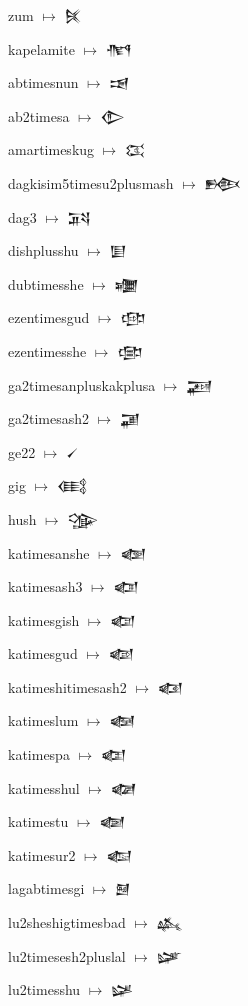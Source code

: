 {\noindent zum $\mapsto$ {\cufont 𒍮}\par
\noindent kapelamite $\mapsto$ {\cufont 𒍯}\par
\noindent abtimesnun $\mapsto$ {\cufont 𒍰}\par
\noindent ab2timesa $\mapsto$ {\cufont 𒍱}\par
\noindent amartimeskug $\mapsto$ {\cufont 𒍲}\par
\noindent dagkisim5timesu2plusmash $\mapsto$ {\cufont 𒍳}\par
\noindent dag3 $\mapsto$ {\cufont 𒍴}\par
\noindent dishplusshu $\mapsto$ {\cufont 𒍵}\par
\noindent dubtimesshe $\mapsto$ {\cufont 𒍶}\par
\noindent ezentimesgud $\mapsto$ {\cufont 𒍷}\par
\noindent ezentimesshe $\mapsto$ {\cufont 𒍸}\par
\noindent ga2timesanpluskakplusa $\mapsto$ {\cufont 𒍹}\par
\noindent ga2timesash2 $\mapsto$ {\cufont 𒍺}\par
\noindent ge22 $\mapsto$ {\cufont 𒍻}\par
\noindent gig $\mapsto$ {\cufont 𒍼}\par
\noindent hush $\mapsto$ {\cufont 𒍽}\par
\noindent katimesanshe $\mapsto$ {\cufont 𒍾}\par
\noindent katimesash3 $\mapsto$ {\cufont 𒍿}\par
\noindent katimesgish $\mapsto$ {\cufont 𒎀}\par
\noindent katimesgud $\mapsto$ {\cufont 𒎁}\par
\noindent katimeshitimesash2 $\mapsto$ {\cufont 𒎂}\par
\noindent katimeslum $\mapsto$ {\cufont 𒎃}\par
\noindent katimespa $\mapsto$ {\cufont 𒎄}\par
\noindent katimesshul $\mapsto$ {\cufont 𒎅}\par
\noindent katimestu $\mapsto$ {\cufont 𒎆}\par
\noindent katimesur2 $\mapsto$ {\cufont 𒎇}\par
\noindent lagabtimesgi $\mapsto$ {\cufont 𒎈}\par
\noindent lu2sheshigtimesbad $\mapsto$ {\cufont 𒎉}\par
\noindent lu2timesesh2pluslal $\mapsto$ {\cufont 𒎊}\par
\noindent lu2timesshu $\mapsto$ {\cufont 𒎋}\par
}
